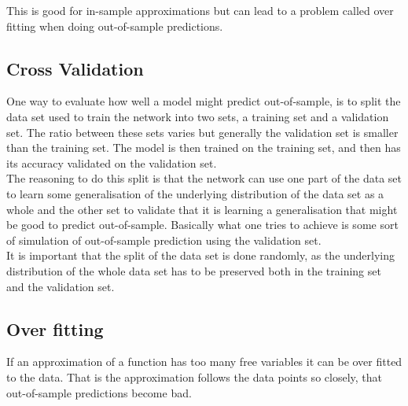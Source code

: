 \documentclass[11pt, letterpaper]{amsart}
\begin{document}
This is good for in-sample approximations but can lead to a problem called over fitting when doing out-of-sample predictions.

\subsection{Cross Validation}
One way to evaluate how well a model might predict out-of-sample, is to split the data set used to train the network into two sets, a training set and a validation set. The ratio between these sets varies but generally the validation set is smaller than the training set. The model is then trained on the training set, and then has its accuracy validated on the validation set.
\\

The reasoning to do this split is that the network can use one part of the data set to learn some generalisation of the underlying distribution of the data set as a whole and the other set to validate that it is learning a generalisation that might be good to predict out-of-sample. Basically what one tries to achieve is some sort of simulation of out-of-sample prediction using the validation set.
\\

It is important that the split of the data set is done randomly, as the underlying distribution of the whole data set has to be preserved both in the training set and the validation set.

\subsection{Over fitting}
If an approximation of a function has too many free variables it can be over fitted to the data. That is the approximation follows the data points so closely, that out-of-sample predictions become bad.
\\
\end{document}
